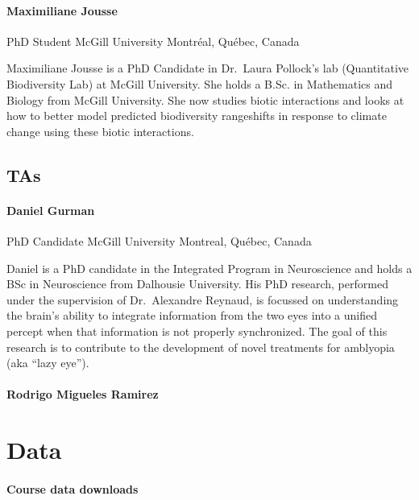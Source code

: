 \documentclass[
]{book}
\begin{document}
\subsubsection{Maximiliane Jousse}\label{maximiliane-jousse}

PhD Student
McGill University
Montréal, Québec, Canada

Maximiliane Jousse is a PhD Candidate in Dr.~Laura Pollock's lab (Quantitative Biodiversity Lab) at McGill University. She holds a B.Sc. in Mathematics and Biology from McGill University. She now studies biotic interactions and looks at how to better model predicted biodiversity rangeshifts in response to climate change using these biotic interactions.

\section{TAs}\label{tas}

\subsubsection{Daniel Gurman}\label{daniel-gurman}

PhD Candidate
McGill University
Montreal, Québec, Canada

Daniel is a PhD candidate in the Integrated Program in Neuroscience and holds a BSc in Neuroscience from Dalhousie University. His PhD research, performed under the supervision of Dr.~Alexandre Reynaud, is focussed on understanding the brain's ability to integrate information from the two eyes into a unified percept when that information is not properly synchronized. The goal of this research is to contribute to the development of novel treatments for amblyopia (aka ``lazy eye'').

\subsubsection{Rodrigo Migueles Ramirez}\label{rodrigo-migueles-ramirez}

\chapter{Data}\label{data}

\subsubsection{Course data downloads}\label{course-data-downloads}
\end{document}
